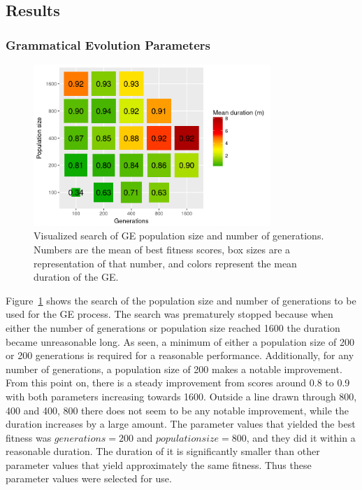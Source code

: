 
\subsection{Results}
\subsubsection{Grammatical Evolution Parameters}
\begin{figure}
    \centering
    \includegraphics[width=0.8\textwidth]{figures/ge-size-sampling}
    \caption[Visualized search of GE population size and number of generations]{Visualized search of \gls{GE} population size and number of generations. Numbers are the mean of best fitness scores, box sizes are a representation of that number, and colors represent the mean duration of the \gls{GE}.}
    \label{fig:size-sampling}
\end{figure}

Figure~\ref{fig:size-sampling} shows the search of the population size and number of generations to be used for the \gls{GE} process.
The search was prematurely stopped because when either the number of generations or population size reached 1600 the duration became unreasonable long.
As seen, a minimum of either a population size of 200 or 200 generations is required for a reasonable performance.
Additionally, for any number of generations, a population size of 200 makes a notable improvement.
From this point on, there is a steady improvement from scores around 0.8 to 0.9 with both parameters increasing towards 1600.
Outside a line drawn through 800, 400 and 400, 800 there does not seem to be any notable improvement, while the duration increases by a large amount.
The parameter values that yielded the best fitness was $generations = 200$ and $population size = 800$, and they did it within a reasonable duration.
The duration of it is significantly smaller than other parameter values that yield approximately the same fitness.
Thus these parameter values were selected for use.

